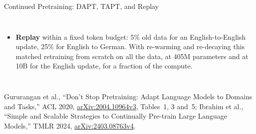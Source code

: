 \begin{frame}{Continued Pretraining: DAPT, TAPT, and Replay}
\begin{columns}[T,onlytextwidth]
\begin{itemize}
        \item[\textcolor{red}{$\blacktriangleright$}] \textbf{Replay} within a fixed token budget: 5\% old data for an English-to-English update, 25\% for English to German. With re-warming and re-decaying this matched retraining from scratch on all the data, at 405M parameters and at 10B for the English update, for a fraction of the compute.
      \end{itemize}
  \end{columns}
  \vspace{0.1em}
  {\scriptsize Gururangan et al., ``Don't Stop Pretraining: Adapt Language Models to Domains and Tasks,'' ACL 2020, \href{https://arxiv.org/abs/2004.10964v3}{arXiv:2004.10964v3}, Tables~1, 3 and~5; Ibrahim et al., ``Simple and Scalable Strategies to Continually Pre-train Large Language Models,'' TMLR 2024, \href{https://arxiv.org/abs/2403.08763v4}{arXiv:2403.08763v4}.}
\end{frame}

